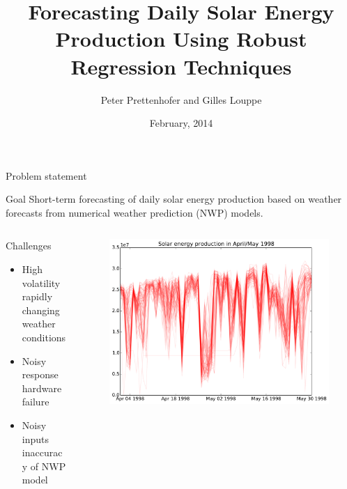 \documentclass[handout]{beamer}
\title{Forecasting Daily Solar Energy Production Using Robust Regression Techniques}
\author{Peter Prettenhofer and Gilles Louppe}
\institute{Graz University of Technology, Austria\\
Université de Liège, Belgium}
\date{February, 2014}
\begin{document}

\begin{frame}
\titlepage
\end{frame}



\begin{frame}{Problem statement}
  \begin{block}{Goal}
      Short-term forecasting of daily solar energy production based on weather forecasts from numerical weather prediction (NWP) models.
  \end{block}


\begin{columns}[T]
\begin{column}{.45\textwidth}

  \begin{block}{Challenges}
      \begin{itemize}
         \item High volatility \\{\tiny rapidly changing weather conditions}

         \item Noisy response \\ {\tiny hardware failure}
         \item Noisy inputs \\ {\tiny inaccuracy of NWP model}
      \end{itemize}
  \end{block}

\end{column}
\begin{column}{.45\textwidth}
  \begin{figure}
    \includegraphics[width=\textwidth]{images/volatility.pdf}
  \end{figure}

\end{column}
\end{columns}
\end{frame}
\end{document}
